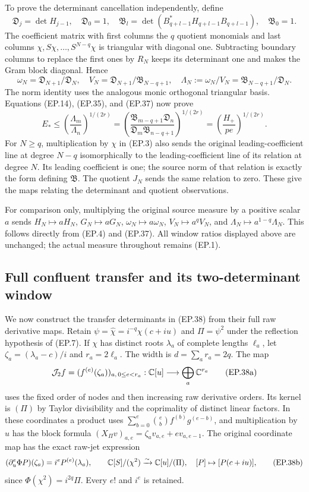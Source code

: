 To prove the determinant cancellation independently, define
\[
 \mathfrak D_j=\det H_{j-1},\quad\mathfrak D_0=1,\quad
 \mathfrak B_l=\det(B_{q+l-1}^*H_{q+l-1}B_{q+l-1}),
 \quad\mathfrak B_0=1.\tag{EP.36}
\]
The coefficient matrix with first columns the $q$ quotient monomials
and last columns $\chi,S\chi,\ldots,S^{N-q}\chi$ is triangular
with diagonal one. Subtracting boundary columns to replace the first
ones by $R_N$ keeps its determinant one and makes the Gram block
diagonal. Hence
\[
 \omega_N=\mathfrak D_{N+1}/\mathfrak D_N,\quad
 V_N=\mathfrak D_{N+1}/\mathfrak B_{N-q+1},\quad
 \Lambda_N:=\omega_N/V_N=\mathfrak B_{N-q+1}/\mathfrak D_N.
\tag{EP.37}
\]
The norm identity uses the analogous monic orthogonal triangular
basis. Equations (EP.14), (EP.35), and (EP.37) now prove
\[
 \boxed{E_*\le\left(\frac{\Lambda_m}{\Lambda_n}\right)^{1/(2r)}
 =\left(\frac{\mathfrak B_{m-q+1}\mathfrak D_n}
 {\mathfrak D_m\mathfrak B_{n-q+1}}\right)^{1/(2r)}
 =\left(\frac{H_+}{pe}\right)^{1/(2r)}.}\tag{EP.38}
\]
For $N\ge q$, multiplication by $\chi$ in (EP.3) also sends the original
leading-coefficient line at degree $N-q$ isomorphically to the
leading-coefficient line of its relation at degree $N$. Its leading
coefficient is one; the source norm of that relation is exactly the
form defining $\mathfrak B$. The quotient $J_N$ sends the same
relation to zero. These give the maps relating the determinant and
quotient observations.

For comparison only, multiplying the original source measure by a
positive scalar $a$ sends $H_N\mapsto aH_N$, $G_N\mapsto aG_N$,
$\omega_N\mapsto a\omega_N$, $V_N\mapsto a^qV_N$, and
$\Lambda_N\mapsto a^{1-q}\Lambda_N$. This follows directly from
(EP.4) and (EP.37). All window ratios displayed above are unchanged;
the actual measure throughout remains (EP.1).

\subsection{Full confluent transfer and its two-determinant window}
We now construct the transfer determinants in (EP.38) from their full
raw derivative maps. Retain $\psi=\widehat\chi=i^{-q}\chi(c+iu)$
and $\Pi=\psi^2$ under the reflection hypothesis of (EP.7). If
$\chi$ has distinct roots $\lambda_a$ of complete lengths $\ell_a$,
let $\zeta_a=(\lambda_a-c)/i$ and $r_a=2\ell_a$.
The width is $d=\sum_a r_a=2q$. The map
\[
 \mathcal J_2 f=(f^{(e)}(\zeta_a))_{a,\,0\le e<r_a}:
 \mathbb C[u]\longrightarrow\bigoplus_a\mathbb C^{r_a}\tag{EP.38a}
\]
uses the fixed order of nodes and then increasing raw derivative
orders. Its kernel is $(\Pi)$ by Taylor divisibility and the
coprimality of distinct linear factors. In these coordinates a product
uses $\sum_{b=0}^e\binom eb f^{(b)}g^{(e-b)}$, and multiplication
by $u$ has the block formula
$(X_\Pi v)_{a,e}=\zeta_av_{a,e}+e v_{a,e-1}$.
The original coordinate map has the exact raw-jet expression
\[
 (\partial_u^e\Phi P)(\zeta_a)=i^eP^{(e)}(\lambda_a),\qquad
 \mathbb C[S]/(\chi^2)\xrightarrow{\sim}\mathbb C[u]/(\Pi),\quad
 [P]\mapsto[P(c+iu)],\tag{EP.38b}
\]
since $\Phi(\chi^2)=i^{2q}\Pi$. Every $e!$ and $i^e$ is retained.

